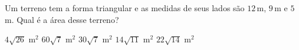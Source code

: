 \noindent\parbox{\linewidth}{

Um terreno tem a forma triangular e as medidas de seus lados são $12$\,m, $9$\,m e $5$\,m. Qual é a área desse terreno?

$4\sqrt{26}$ m$^2$
$60\sqrt{7}$ m$^2$
$30\sqrt{7}$ m$^2$
$14\sqrt{11}$ m$^2$
$22\sqrt{14}$ m$^2$



}


